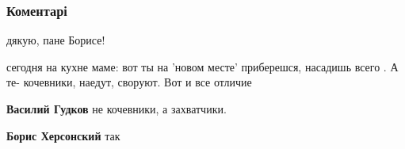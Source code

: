  
 
 
 
 
\subsubsection{Коментарі}

\begin{itemize}
 
дякую, пане Борисе!

 
сегодня на кухне маме: вот ты на 'новом месте' приберешся, насадишь всего . А
те- кочевники, наедут, своруют. Вот и все отличие

\begin{itemize}
 
\textbf{Василий Гудков} не кочевники, а захватчики.

 
\textbf{Борис Херсонский} так

 


\end{itemize}
\end{itemize}
